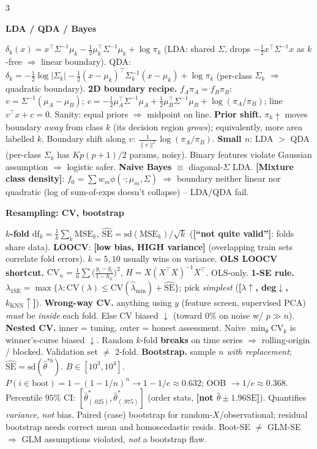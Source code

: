 \documentclass[a4paper,8pt]{extarticle}
\renewcommand{\section}[1]{\par\vspace{2pt}\noindent\colorbox{black!15}{\parbox{0.97\linewidth}{\strut\bfseries\small #1}}\par\vspace{1pt}}
\newcommand{\hd}[1]{\textbf{#1.}}
\newcommand{\tr}[1]{\textcolor{red!70!black}{\textbf{[#1]}}} %
\newcommand{\df}{\mathrm{df}}
\begin{document}
\begin{multicols*}{3}
\section{LDA / QDA / Bayes}
$\delta_k(x)=x^\top\Sigma^{-1}\mu_k -\tfrac12\mu_k^\top\Sigma^{-1}\mu_k+\log\pi_k$ (LDA: shared $\Sigma$, drops $-\tfrac12 x^\top\Sigma^{-1}x$ as $k$-free $\Rightarrow$ linear boundary).
QDA: $\delta_k=-\tfrac12\log|\Sigma_k|-\tfrac12(x-\mu_k)^\top\Sigma_k^{-1}(x-\mu_k)+\log\pi_k$ (per-class $\Sigma_k$ $\Rightarrow$ quadratic boundary).
\hd{2D boundary recipe} $f_A\pi_A=f_B\pi_B$: $v=\Sigma^{-1}(\mu_A-\mu_B);\ c=-\tfrac12\mu_A^\top\Sigma^{-1}\mu_A+\tfrac12\mu_B^\top\Sigma^{-1}\mu_B+\log(\pi_A/\pi_B)$; line $v^\top x+c=0$.
Sanity: equal priors $\Rightarrow$ midpoint on line.
\hd{Prior shift} $\pi_k\uparrow$ moves boundary \emph{away} from class $k$ (its decision region \emph{grows}); equivalently, more area labelled $k$. Boundary shift along $v$: $\tfrac{1}{\|v\|^2}\log(\pi_A/\pi_B)$.
\textbf{Small $n$}: LDA $>$ QDA (per-class $\Sigma_k$ has $Kp(p+1)/2$ params, noisy). Binary features violate Gaussian assumption $\Rightarrow$ logistic safer.
\textbf{Naive Bayes} $\equiv$ diagonal-$\Sigma$ LDA.
\tr{Mixture class density}: $f_0=\sum w_m\phi(\cdot;\mu_m,\Sigma)$ $\Rightarrow$ boundary neither linear nor quadratic (log of sum-of-exps doesn't collapse) -- LDA/QDA fail.

\section{Resampling: CV, bootstrap}
\textbf{$k$-fold} $\df_k=\tfrac{1}{k}\sum_k\!\text{MSE}_k$, $\widehat{\text{SE}}=\text{sd}(\text{MSE}_k)/\sqrt k$ (\tr{``not quite valid''}: folds share data).
\textbf{LOOCV}: \tr{low bias, HIGH variance} (overlapping train sets correlate fold errors). $k{=}5,10$ usually wins on variance.
\hd{OLS LOOCV shortcut} $\text{CV}_n=\tfrac1n\sum\!\bigl(\tfrac{y_i-\hat y_i}{1-h_{ii}}\bigr)^2$, $H=X(X^\top X)^{-1}X^\top$. OLS-only.
\hd{1-SE rule} $\lambda_{1\text{SE}}=\max\{\lambda:\text{CV}(\lambda)\le\text{CV}(\hat\lambda_{\min})+\widehat{\text{SE}}\}$; pick \emph{simplest} (\tr{$\lambda\uparrow$, deg$\downarrow$, $k_{\text{KNN}}\uparrow$}).
\hd{Wrong-way CV} anything using $y$ (feature screen, supervised PCA) \emph{must} be \emph{inside} each fold. Else CV biased $\downarrow$ (toward $0\%$ on noise w/ $p\!\gg\! n$).
\hd{Nested CV} inner = tuning, outer = honest assessment. Naive $\min_\theta\text{CV}_k$ is winner's-curse biased $\downarrow$.
Random $k$-fold \textbf{breaks} on time series $\Rightarrow$ rolling-origin / blocked. Validation set $\ne$ 2-fold.
\hd{Bootstrap} sample $n$ \emph{with replacement}; $\widehat{\text{SE}}=\text{sd}(\hat\theta^{*b})$. $B\!\in\![10^3,10^4]$.
$P(i\in\text{boot})=1-(1-1/n)^n\to 1-1/e\!\approx\!0.632$; OOB $\to 1/e\!\approx\!0.368$.
Percentile $95\%$ CI: $[\hat\theta^{*}_{(.025)},\hat\theta^{*}_{(.975)}]$ (order stats, \tr{not $\hat\theta\pm1.96\text{SE}$}). Quantifies \emph{variance}, \emph{not} bias. Paired (case) bootstrap for random-$X$/observational; residual bootstrap needs correct mean and homoscedastic resids. Boot-SE $\ne$ GLM-SE $\Rightarrow$ GLM assumptions violated, \emph{not} a bootstrap flaw.


\end{multicols*}
\end{document}
